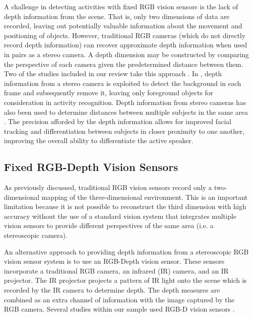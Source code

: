 \documentclass[12pt]{report}
\begin{document}
A challenge in detecting activities with fixed RGB vision sensors is the lack of depth information from the scene. That is, only two dimensions of data are recorded, leaving out potentially valuable information about the movement and positioning of objects. However, traditional RGB cameras (which do not directly record depth information) can recover approximate depth information when used in pairs as a stereo camera. A depth dimension may be constructed by comparing the perspective of each camera given the predetermined distance between them. Two of the studies included in our review take this approach \cite{Lim2009, Bloisi2009}. In \cite{Bloisi2009}, depth information from a stereo camera is exploited to detect the background in each frame and subsequently remove it, leaving only foreground objects for consideration in activity recognition. Depth information from stereo cameras has also been used to determine distances between multiple subjects in the same area \cite{Lim2009}. The precision afforded by the depth information allows for improved facial tracking and differentiation between subjects in closer proximity to one another, improving the overall ability to differentiate the active speaker.

\subsection{Fixed RGB-Depth Vision Sensors}

As previously discussed, traditional RGB vision sensors record only a two-dimensional mapping of the three-dimensional environment. This is an important limitation because it is not possible to reconstruct the third dimension with high accuracy without the use of a standard vision system that integrates multiple vision sensors to provide different perspectives of the same area (i.e. a stereoscopic camera).

An alternative approach to providing depth information from a stereoscopic RGB vision sensor system is to use an RGB-Depth vision sensor. These sensors incorporate a traditional RGB camera, an infrared (IR) camera, and an IR projector. The IR projector projects a pattern of IR light onto the scene which is recorded by the IR camera to determine depth. The depth measures are combined as an extra channel of information with the image captured by the RGB camera. Several studies within our sample used RGB-D vision sensors \cite{Banerjee2014, Yao2016, Akbari2017, Zhao2017, Figueroa-Angulo2013, Ong2013}.
\end{document}

